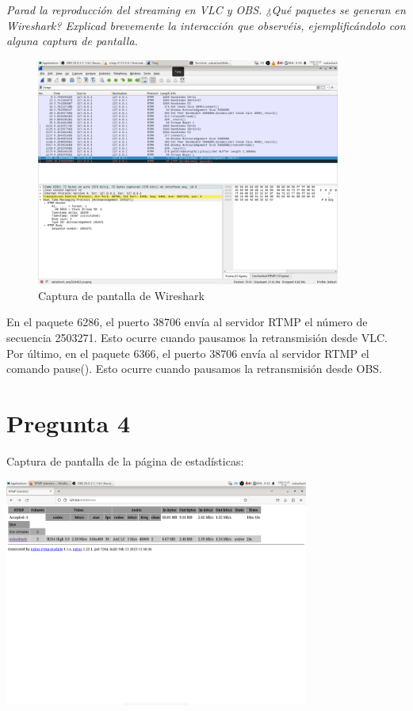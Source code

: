 \documentclass[spanish]{article}
\begin{document}
\textit{Parad la reproducción del streaming en VLC y OBS.
¿Qué paquetes se generan en Wireshark? Explicad brevemente
la interacción que observéis, ejemplificándolo con alguna
captura de pantalla.}

\begin{figure}[!htbp]
\begin{center}
\includegraphics[width=10cm]{../img/11.png}
\caption{Captura de pantalla de Wireshark}
\end{center}
\end{figure}

En el paquete 6286, el puerto 38706 envía al servidor RTMP
el número de secuencia 2503271. Esto ocurre cuando pausamos
la retransmisión desde VLC.\\

Por último, en el paquete 6366, el puerto 38706 envía al
servidor RTMP el comando pause(). Esto ocurre cuando
pausamos la retransmisión desde OBS.

\newpage

\section{Pregunta 4}

Captura de pantalla de la página de estadísticas:

\begin{center}
\includegraphics[width=10cm]{../img/12.png}
\end{center}
\end{document}
